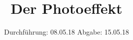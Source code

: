 

\subject{V500}
\title{Der Photoeffekt}
\date{
  Durchführung: 08.05.18
  \hspace{3em}
  Abgabe: 15.05.18
}



\maketitle
\thispagestyle{empty}
\tableofcontents
\newpage








\newpage
\printbibliography


